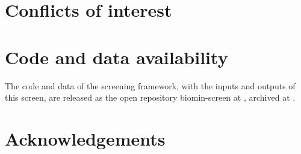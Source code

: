 \section*{Conflicts of interest}
\nacreCompetingInterests

\section*{Code and data availability}
The code and data of the screening framework, with the inputs and outputs of this screen, are released as the open repository biomin-screen at \nacreRepoURL, archived at \nacreZenodoDOI.

\section*{Acknowledgements}
\nacreFunding

\nacreCompute

